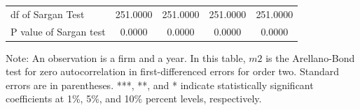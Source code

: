 \begin{table}[H]
\begin{threeparttable}
\begin{tabular}{l|c c| c c}
df of Sargan Test& 251.0000         & 251.0000         & 251.0000         & 251.0000         \\
P value of Sargan test&   0.0000         &   0.0000         &   0.0000         &   0.0000         \\
    \bottomrule
  \end{tabular} 
\begin{tablenotes}
\small
\item Note: An observation is a firm and a year. In this table, $m2$ is the Arellano-Bond test for zero autocorrelation in first-differenced errors for order two.  Standard errors are in parentheses. ***, **, and * indicate statistically significant coefficients at 1\%, 5\%, and 10\% percent levels, respectively.
 \end{tablenotes}
 \end{threeparttable}
\end{table}

